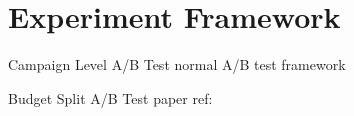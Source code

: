 \documentclass[../main.tex]{subfiles}
\begin{document}
	\chapter{Experiment Framework}
	

	\begin{section}{Campaign Level A/B Test}
		normal A/B test framework
	\end{section}
	
	\begin{section} {Budget Split A/B Test}
		paper ref: \cite{liu2020trustworthy}
	\end{section}
	
\end{document}
